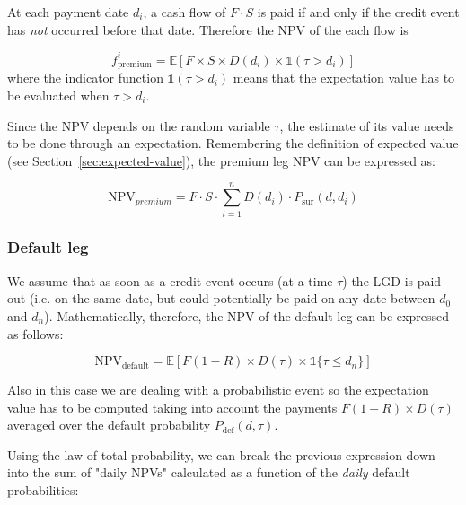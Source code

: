 At each payment date \(d_i\), a cash flow of \(F\cdot S\) is paid if and only if the credit event has \emph{not} occurred before that date. Therefore the NPV of the each flow is

\begin{equation}
f_{\textrm{premium}}^i = \mathbb{E}\left[F\times S \times D(d_i) \times \mathbb{1}(\tau > d_i) \right]
\end{equation}
where the indicator function \(\mathbb{1}(\tau > d_i)\) means that the expectation value has to be evaluated when \(\tau > d_i\). 

Since the NPV depends on the random variable $\tau$, the estimate of its value needs to be done through an expectation.
Remembering the definition of expected value (see Section~\ref{sec:expected-value}), %
the premium leg NPV can be expressed as:

\begin{equation}
	\textrm{NPV}_{premium} = F\cdot S \cdot \sum_{i=1}^{n} D(d_i) \cdot P_{\textrm{sur}}(d, d_i)
\end{equation}

\subsubsection{Default leg}\label{default-leg}

We assume that as soon as a credit event occurs (at a time $\tau$) the LGD is paid out (i.e. on the same date, but could potentially be paid on any date between \(d_0\) and \(d_n\)). Mathematically, therefore, the NPV of the default leg can be expressed as follows:

\begin{equation}
\mathrm{NPV_{default}} =\mathbb{E}[F(1-R) \times D(\tau) \times \mathbb{1} \{\tau \leq d_n\} ]
\end{equation}

Also in this case we are dealing with a probabilistic event so the expectation value has to be computed taking into account the payments $F(1-R)\times D(\tau)$ averaged over the default probability $P_{\textrm{def}}(d, \tau)$. 

Using the law of total probability, we can break the previous expression down into the sum of "daily NPVs" calculated as a function of the \emph{daily} default probabilities:

